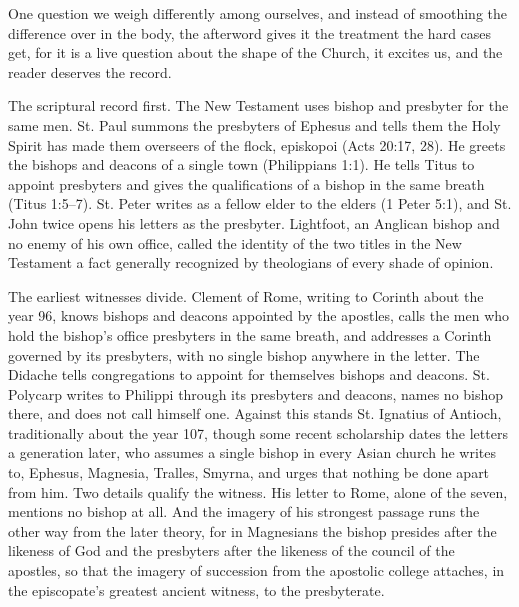 One question we weigh differently among ourselves, and instead of smoothing the difference over in the body, the afterword gives it the treatment the hard cases get, for it is a live question about the shape of the Church, it excites us, and the reader deserves the record.

The scriptural record first. The New Testament uses bishop and presbyter for the same men. St. Paul summons the presbyters of Ephesus and tells them the Holy Spirit has made them overseers of the flock, episkopoi (Acts 20:17, 28). He greets the bishops and deacons of a single town (Philippians 1:1). He tells Titus to appoint presbyters and gives the qualifications of a bishop in the same breath (Titus 1:5–7). St. Peter writes as a fellow elder to the elders (1 Peter 5:1), and St. John twice opens his letters as the presbyter. Lightfoot, an Anglican bishop and no enemy of his own office, called the identity of the two titles in the New Testament a fact generally recognized by theologians of every shade of opinion.

The earliest witnesses divide. Clement of Rome, writing to Corinth about the year 96, knows bishops and deacons appointed by the apostles, calls the men who hold the bishop's office presbyters in the same breath, and addresses a Corinth governed by its presbyters, with no single bishop anywhere in the letter. The Didache tells congregations to appoint for themselves bishops and deacons. St. Polycarp writes to Philippi through its presbyters and deacons, names no bishop there, and does not call himself one. Against this stands St. Ignatius of Antioch, traditionally about the year 107, though some recent scholarship dates the letters a generation later, who assumes a single bishop in every Asian church he writes to, Ephesus, Magnesia, Tralles, Smyrna, and urges that nothing be done apart from him. Two details qualify the witness. His letter to Rome, alone of the seven, mentions no bishop at all. And the imagery of his strongest passage runs the other way from the later theory, for in Magnesians the bishop presides after the likeness of God and the presbyters after the likeness of the council of the apostles, so that the imagery of succession from the apostolic college attaches, in the episcopate's greatest ancient witness, to the presbyterate.

